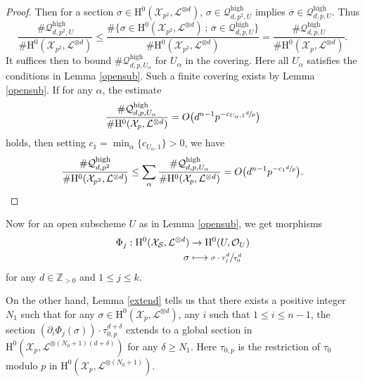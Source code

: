 \documentclass[JEP,XML,SOM,Unicode,published]{cedram}
\newcommand\mto{\mathchoice{\longmapsto}{\mapsto}{\mapsto}{\mapsto}}
\newcommand{\sep}{\,;\,}
\theoremstyle{plain}
\theoremstyle{definition}
\newcommand{\ho}{\mathrm{H}}
\newcommand{\X}{\mathcal{X}}
\newcommand{\li}{\mathcal{L}}
\newcommand{\Z}{\mathbb{Z}}
\begin{document}
\begin{proof}[Proof]
Then for a section $\sigma\in \ho^0(\X_{p^2}, \li^{\otimes d})$, $\sigma \in \mathcal{Q}^{\mathrm{high}}_{d,p^2,U}$ implies $\overline{\sigma}\in \mathcal{Q}^{\mathrm{high}}_{d,p,U}$. Thus
\[
\frac{\#\mathcal{Q}_{d,p^2,U}^{\mathrm{high}}}{\#\ho^0(\X_{p^2}, \li^{\otimes d})}\leq \frac{\#\{ \sigma\in \ho^0(\X_{p^2}, \li^{\otimes d})\sep \overline{\sigma}\in \mathcal{Q}^{\mathrm{high}}_{d,p,U} \} }{\#\ho^0(\X_{p^2}, \li^{\otimes d})} = \frac{\#\mathcal{Q}_{d,p,U}^{\mathrm{high}}}{\#\ho^0(\X_{p}, \li^{\otimes d})}.
\]
It suffices then to bound $\#\mathcal{Q}_{d,p,U_{\alpha}}^{\mathrm{high}}$ for $U_{\alpha}$ in the covering. Here all $U_{\alpha}$ satisfies the conditions in Lemma \ref{opensub}. Such a finite covering exists by Lemma \ref{opensub}. If for any $\alpha$, the estimate\vspace*{-3pt}
\[
\frac{\#\mathcal{Q}_{d,p,U_{\alpha}}^{\mathrm{high}}}{\#\ho^0(\X_{p}, \li^{\otimes d})}=O\bigl(d^{n-1}p^{-c_{U_{\alpha},1}\sfrac{d}{p}} \bigr)
\]
holds, then setting $c_1=\min_{\alpha}\{ c_{U_{\alpha},1} \}>0$, we have\vspace*{-3pt}
\[
\frac{\#\mathcal{Q}_{d,p^2}^{\mathrm{high}}}{\#\ho^0(\X_{p^2}, \li^{\otimes d})}\leq \sum_{\alpha}\frac{\#\mathcal{Q}_{d,p,U_{\alpha}}^{\mathrm{high}}}{\#\ho^0(\X_{p}, \li^{\otimes d})}=O\bigl(d^{n-1}p^{-c_1\sfrac{d}{p}} \bigr).\qedhere
\]
\end{proof}

Now for an open subscheme $U$ as in Lemma \ref{opensub}, we get morphisms
\begin{align*}
\Phi_j: \ho^0(\X_{\mathcal{S}}, \li^{\otimes d}) &\to \ho^0(U, \mathcal{O}_U) \\
\sigma &\mto \sfrac{\sigma\cdot \tau_j^d}{\tau_0^d}
\end{align*}
for any $d\in \Z_{>0}$ and $1\leq j\leq k$.

On the other hand, Lemma \ref{extend} tells us that there exists a positive integer $N_1$ such that for any $\sigma \in \ho^0(\X_{p}, \li^{\otimes d})$, any $i$ such that $1\leq i\leq n-1$, the section $\left(\partial_i \Phi_j(\sigma) \right)\cdot \tau_{0,p}^{d+\delta}$ extends to a global section in $\ho^0(\X_{p}, \li^{\otimes (N_0+1)(d+\delta)})$ for any $\delta \geq N_1$. Here $\tau_{0,p}$ is the restriction of $\tau_0$ modulo $p$ in $\ho^0(\X_p, \li^{\otimes (N_0+1)})$.
\end{document}
